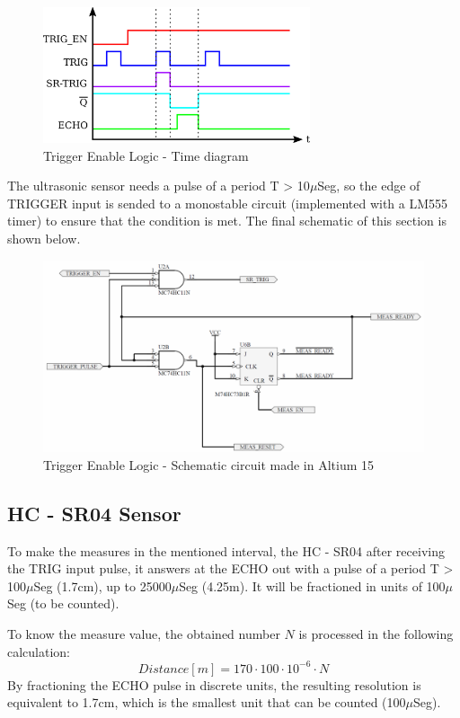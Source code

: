 \begin{figure}[H]
    \begin{centering}
    \includegraphics[width=0.7\textwidth]{data/trigerEnable_Time}
    \par\end{centering}
    \caption{Trigger Enable Logic - Time diagram}
\end{figure}
\newpage
The ultrasonic sensor needs a pulse of a period T > 10$\mu$Seg, 
so the edge of TRIGGER input is sended to a monostable circuit
(implemented with a LM555 timer) to ensure that the condition is met.
The final schematic of this section is shown below.

\begin{figure}[H]
    \begin{centering}
        \includegraphics[width=1\textwidth]{data/trig_enable}
    \par\end{centering}
    \caption{Trigger Enable Logic - Schematic circuit made in Altium 15}
\end{figure}

\subsection*{HC - SR04 Sensor}
To make the measures in the mentioned interval, the HC - SR04 
after receiving the TRIG input pulse, it answers at the ECHO out 
with a pulse of a period T > 100$\mu$Seg (1.7cm), up to 25000$\mu$Seg (4.25m).
It will be fractioned in units of 100$\mu$Seg (to be counted).
\par
To know the measure value, the obtained number $N$ is processed in the
following calculation:
\[
    Distance[m] = 170 \cdot 100 \cdot 10^{-6} \cdot N  
\]
By fractioning the ECHO pulse in discrete units, the resulting resolution is
equivalent to 1.7cm, which is the smallest unit that can be counted (100$\mu$Seg).

